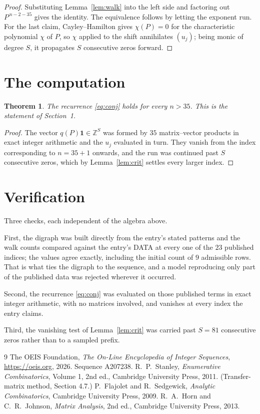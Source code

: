 \documentclass[11pt,a4paper]{article}
\theoremstyle{plain}
\newtheorem{theorem}{Theorem}
\theoremstyle{definition}
\begin{document}
\begin{proof}
Substituting Lemma~\ref{lem:walk} into the left side and factoring out
$P^{\,n-2-35}$ gives the identity. The equivalence follows by letting the exponent
run. For the last claim, Cayley--Hamilton gives $\chi(P)=0$ for the characteristic
polynomial $\chi$ of $P$, so $\chi$ applied to the shift annihilates $(u_j)$; being monic of
degree $S$, it propagates $S$ consecutive zeros forward.
\end{proof}

\section{The computation}

\begin{theorem}
The recurrence \eqref{eq:conj} holds for every $n>35$. This is the statement of
Section~1.
\end{theorem}

\begin{proof}
The vector $q(P)\mathbf{1}\in\mathbb{Z}^{S}$ was formed by $35$ matrix--vector
products in exact integer arithmetic and the $u_j$ evaluated in turn. They vanish from the
index corresponding to $n=35+1$ onwards, and the run was continued past $S$ consecutive
zeros, which by Lemma~\ref{lem:crit} settles every larger index.
\end{proof}

\section{Verification}

Three checks, each independent of the algebra above.

First, the digraph was built directly from the entry's stated patterns and the walk counts
compared against the entry's DATA at every one of the $23$ published indices; the
values agree exactly, including the initial count of $9$ admissible rows. That is
what ties the digraph to the sequence, and a model reproducing only part of the published
data was rejected wherever it occurred.

Second, the recurrence \eqref{eq:conj} was evaluated on those published terms in exact
integer arithmetic, with no matrices involved, and vanishes at every index the entry claims.

Third, the vanishing test of Lemma~\ref{lem:crit} was carried past $S=81$ consecutive
zeros rather than to a sampled prefix.

\begin{thebibliography}{9}
 The OEIS Foundation, \emph{The On-Line Encyclopedia of Integer
Sequences}, \url{https://oeis.org}, 2026. Sequence A207238.
 R.~P.~Stanley, \emph{Enumerative Combinatorics}, Volume 1, 2nd ed.,
Cambridge University Press, 2011. (Transfer-matrix method, Section 4.7.)
 P.~Flajolet and R.~Sedgewick, \emph{Analytic Combinatorics}, Cambridge
University Press, 2009.
 R.~A.~Horn and C.~R.~Johnson, \emph{Matrix Analysis}, 2nd ed., Cambridge
University Press, 2013.
\end{thebibliography}
\end{document}
